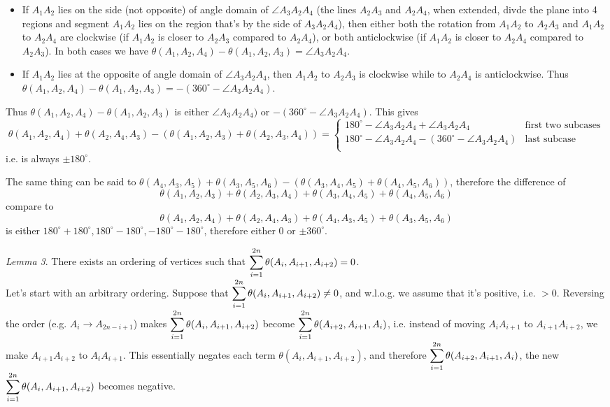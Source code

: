 \documentclass[11pt,a4paper]{article}
\begin{document}
\begin{enumerate}
\begin{itemize}
		\item If $A_1A_2$ lies on the side (not opposite) of angle domain of $\angle A_3A_2A_4$ (the lines $A_2A_3$ and $A_2A_4$, when extended, divde the plane into 4 regions and segment $A_1A_2$ lies on the region that's by the side of $A_3A_2A_4$), then either both the rotation from $A_1A_2$ to $A_2A_3$ and $A_1A_2$ to $A_2A_4$ are clockwise (if $A_1A_2$ is closer to $A_2A_3$ compared to $A_2A_4$), or both anticlockwise (if $A_1A_2$ is closer to $A_2A_4$ compared to $A_2A_3$). In both cases we have $\theta(A_1, A_2, A_4)-\theta(A_1, A_2, A_3)=\angle A_3A_2A_4$. 
		
		\item If $A_1A_2$ lies at the opposite of angle domain of $\angle A_3A_2A_4$, then $A_1A_2$ to $A_2A_3$ is clockwise while to $A_2A_4$ is anticlockwise. Thus $\theta(A_1, A_2, A_4)-\theta(A_1, A_2, A_3)=-(360^{\circ} - \angle A_3A_2A_4)$. 
	\end{itemize}
	
	Thus $\theta(A_1, A_2, A_4)-\theta(A_1, A_2, A_3)$ is either $\angle A_3A_2A_4)$ or $-(360^{\circ} - \angle A_3A_2A_4)$. This gives 
	\[
	\theta(A_1, A_2, A_4)+\theta(A_2, A_4, A_3) - (\theta(A_1, A_2, A_3)+\theta(A_2, A_3, A_4))=\begin{cases}
		180^{\circ} - \angle A_3A_2A_4 + \angle A_3A_2A_4 & \text{first two subcases}\\
		180^{\circ} - \angle A_3A_2A_4 -(360^{\circ} - \angle A_3A_2A_4)& \text{last subcase}\\
	\end{cases}
	\]
	i.e. is always $\pm 180^{\circ}$. 
	
	The same thing can be said to $\theta(A_4, A_3, A_5) + \theta (A_3, A_5, A_6)- (\theta(A_3, A_4, A_5) + \theta (A_4, A_5, A_6))$, therefore the difference of 
	\[
	\theta(A_1, A_2, A_3)+\theta(A_2, A_3, A_4)+\theta(A_3, A_4, A_5) + \theta (A_4, A_5, A_6)
	\]
	compare to 
	\[
	\theta(A_1, A_2, A_4)+\theta(A_2, A_4, A_3)+\theta(A_4, A_3, A_5) + \theta (A_3, A_5, A_6)
	\]
	is either $180^{\circ}+180^{\circ}, 180^{\circ}-180^{\circ}, -180^{\circ}-180^{\circ}$, therefore either 0 or $\pm 360^{\circ}$. 
	
	\emph{Lemma 3}. There exists an ordering of vertices such that $\displaystyle\sum_{i=1}^{2n}\theta(A_i, A_{i+1}, A_{i+2})=0$. \\
	Let's start with an arbitrary ordering. Suppose that $\displaystyle\sum_{i=1}^{2n}\theta(A_i, A_{i+1}, A_{i+2})\neq 0$, and w.l.o.g. we assume that it's positive, i.e. $>0$. Reversing the order (e.g. $A_{i}\to A_{2n-i+1}$) makes $\displaystyle\sum_{i=1}^{2n}\theta(A_i, A_{i+1}, A_{i+2})$ become $\displaystyle\sum_{i=1}^{2n}\theta(A_{i+2}, A_{i+1}, A_{i})$, i.e. instead of moving $A_iA_{i+1}$ to $A_{i+1}A_{i+2}$, we make $A_{i+1}A_{i+2}$ to $A_iA_{i+1}$. This essentially negates each term $\theta(A_i, A_{i+1}, A_{i+2})$, and therefore $\displaystyle\sum_{i=1}^{2n}\theta(A_{i+2}, A_{i+1}, A_{i})$, the new $\displaystyle\sum_{i=1}^{2n}\theta(A_i, A_{i+1}, A_{i+2})$ becomes negative. 
	

\end{enumerate}
\end{document}
